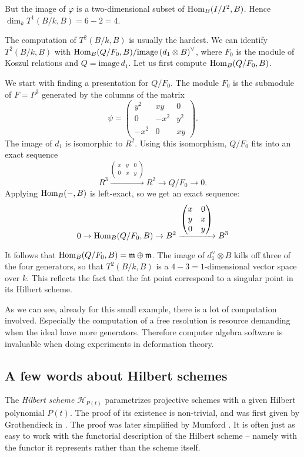 \begin{example}
But the image of $\varphi$ is a two-dimensional subset of $\operatorname{Hom}_B(I/I^2,B)$. Hence $\dim_k T^1(B/k,B) = 6-2=4$.

The computation of $T^2(B/k,B)$ is usually the hardest. We can identify $T^2(B/k,B)$ with $\operatorname{Hom}_B(Q/F_0,B)/\mathrm{image } \left(d_1 \otimes B\right)^{\vee}$, where $F_0$ is the module of Koszul relations and $Q= \mathrm{image } \, d_1$. Let us first compute $\operatorname{Hom}_B(Q/F_0,B)$. 

We start with finding a presentation for $Q/F_0$. The module $F_0$ is the submodule of $F=P^3$ generated by the columns of the matrix
\[
\psi = \begin{pmatrix}
y^2 & xy & 0 \\
0 & -x^2 & y^2 \\
-x^2 & 0 & xy
\end{pmatrix}.
\]
The image of $d_1$ is isomorphic to $R^2$. Using this isomorphism, $Q/F_0$ fits into an exact sequence
\[
R^3 \xrightarrow{
	\begin{pmatrix}
	x & y & 0 \\ 0 & x & y
	\end{pmatrix}
} R^2 \to Q/F_0 \to 0.
\]
Applying $\operatorname{Hom}_B(-,B)$ is left-exact, so we get an exact sequence:
\[
0 \to \operatorname{Hom}_B(Q/F_0,B) \to B^2 \xrightarrow{
	\begin{pmatrix}
	x & 0 \\ y & x \\ 0 & y
	\end{pmatrix}
} B^3
\]

It follows that $\operatorname{Hom}_B(Q/F_0,B)= \mathfrak m \oplus \mathfrak m$.  The image of $d_1^\vee \otimes B$ kills off three of the four generators, so that $T^2(B/k,B)$ is a $4-3=1$-dimensional vector space over $k$. This reflects the fact that the fat point correspond to a singular point in its Hilbert scheme.

As we can see, already for this small example, there is a lot of computation involved. Especially the computation of a free resolution is resource demanding when the ideal have more generators. Therefore computer algebra software is invaluable when doing experiments in deformation theory.
\end{example}

\subsection{A few words about Hilbert schemes}

The \emph{Hilbert scheme} $\mathscr H_{P(t)}$ parametrizes projective schemes with a given Hilbert polynomial $P(t)$. The proof of its existence is non-trivial, and was first given by Grothendieck in \cite{MR1611822}. The proof was later simplified by Mumford \cite{MR0209285}. It is often just as easy to work with the functorial description of the Hilbert scheme -- namely with the functor it represents rather than the scheme itself.

